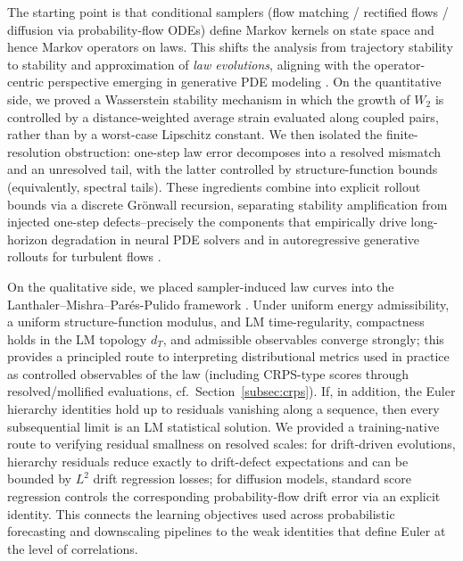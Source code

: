 \documentclass{article}
\numberwithin{equation}{section}
\theoremstyle{plain}
\theoremstyle{definition}
\theoremstyle{remark}
\begin{document}
The starting point is that conditional samplers (flow matching / rectified flows / diffusion via probability-flow ODEs)
define Markov kernels on state space and hence Markov operators on laws. This shifts the analysis from trajectory
stability to stability and approximation of \emph{law evolutions}, aligning with the operator-centric perspective emerging
in generative PDE modeling \cite{chen2025bridging,armegioiu2025rectified,molinaro2024generative}. On the quantitative side,
we proved a Wasserstein stability mechanism in which the growth of $W_2$ is controlled by a distance-weighted average
strain evaluated along coupled pairs, rather than by a worst-case Lipschitz constant. We then isolated the finite-resolution
obstruction: one-step law error decomposes into a resolved mismatch and an unresolved tail, with the latter controlled by
structure-function bounds (equivalently, spectral tails). These ingredients combine into explicit rollout bounds via a
discrete Gr\"onwall recursion, separating stability amplification from injected one-step defects--precisely the components
that empirically drive long-horizon degradation in neural PDE solvers \cite{lippe2308pde,schiff2024dyslim} and in
autoregressive generative rollouts for turbulent flows \cite{kohl2023benchmarking}.

On the qualitative side, we placed sampler-induced law curves into the Lanthaler--Mishra--Par\'es-Pulido framework
\cite{LMP2021}. Under uniform energy admissibility, a uniform structure-function modulus, and LM time-regularity,
compactness holds in the LM topology $d_T$, and admissible observables converge strongly; this provides a principled route
to interpreting distributional metrics used in practice as controlled observables of the law (including CRPS-type scores
through resolved/mollified evaluations, cf.\ Section~\ref{subsec:crps}). If, in addition, the Euler hierarchy identities
hold up to residuals vanishing along a sequence, then every subsequential limit is an LM statistical solution. We provided
a training-native route to verifying residual smallness on resolved scales: for drift-driven evolutions, hierarchy
residuals reduce exactly to drift-defect expectations and can be bounded by $L^2$ drift regression losses; for diffusion
models, standard score regression controls the corresponding probability-flow drift error via an explicit identity. This
connects the learning objectives used across probabilistic forecasting and downscaling pipelines
\cite{lang2026aifs,larsson2025diffusion,aich2024conditional,mardani2025residual,jin2023downscaling} to the weak identities
that define Euler at the level of correlations.
\end{document}
